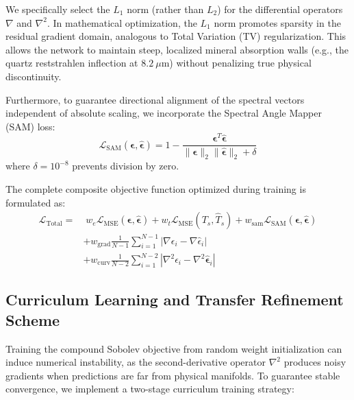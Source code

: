 \documentclass[journal]{IEEEtran}
\begin{document}
We specifically select the $L_1$ norm (rather than $L_2$) for the differential operators $\nabla$ and $\nabla^2$. In mathematical optimization, the $L_1$ norm promotes sparsity in the residual gradient domain, analogous to Total Variation (TV) regularization. This allows the network to maintain steep, localized mineral absorption walls (e.g., the quartz reststrahlen inflection at $8.2\ \mu\text{m}$) without penalizing true physical discontinuity.

Furthermore, to guarantee directional alignment of the spectral vectors independent of absolute scaling, we incorporate the Spectral Angle Mapper (SAM) loss:
\begin{equation}
\mathcal{L}_{\text{SAM}}(\bm{\epsilon}, \hat{\bm{\epsilon}}) = 1 - \frac{\bm{\epsilon}^T \hat{\bm{\epsilon}}}{\|\bm{\epsilon}\|_2 \|\hat{\bm{\epsilon}}\|_2 + \delta}
\label{eq:sam_def}
\end{equation}
where $\delta = 10^{-8}$ prevents division by zero.

The complete composite objective function optimized during training is formulated as:
\begin{align}
\mathcal{L}_{\text{Total}} = &\; w_e \mathcal{L}_{\text{MSE}}(\bm{\epsilon}, \hat{\bm{\epsilon}}) + w_t \mathcal{L}_{\text{MSE}}(T_s, \hat{T}_s) + w_{\text{sam}} \mathcal{L}_{\text{SAM}}(\bm{\epsilon}, \hat{\bm{\epsilon}}) \nonumber \\
&+ w_{\text{grad}} \frac{1}{N-1}\sum_{i=1}^{N-1} |\nabla \epsilon_i - \nabla \hat{\epsilon}_i| \nonumber \\
&+ w_{\text{curv}} \frac{1}{N-2}\sum_{i=1}^{N-2} |\nabla^2 \epsilon_i - \nabla^2 \hat{\bm{\epsilon}}_i|
\label{eq:total_sobolev_loss}
\end{align}

\subsection{Curriculum Learning and Transfer Refinement Scheme}
Training the compound Sobolev objective from random weight initialization can induce numerical instability, as the second-derivative operator $\nabla^2$ produces noisy gradients when predictions are far from physical manifolds. To guarantee stable convergence, we implement a two-stage curriculum training strategy:
\end{document}
